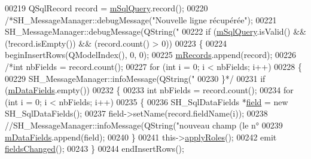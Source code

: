\begin{DoxyCode}
00219                 QSqlRecord record = \hyperlink{classSimpleHotel_1_1SH__SqlDataModel_a6dec49c799f534f4b19902e6eb1c99a7}{mSqlQuery}.record();
00220                 \textcolor{comment}{/*SH\_MessageManager::debugMessage("Nouvelle ligne récupérée");}
00221 \textcolor{comment}{                SH\_MessageManager::debugMessage(QString("%
00222                 \textcolor{keywordflow}{if} (\hyperlink{classSimpleHotel_1_1SH__SqlDataModel_a6dec49c799f534f4b19902e6eb1c99a7}{mSqlQuery}.isValid() && (!record.isEmpty()) && (record.count() > 0))
00223                 \{
00224                     beginInsertRows(QModelIndex(), 0, 0);
00225                     \hyperlink{classSimpleHotel_1_1SH__SqlDataModel_af73abbb951de936944285571f34407c5}{mRecords}.append(record);
00226                     \textcolor{comment}{/*int nbFields = record.count();}
00227 \textcolor{comment}{                    for (int i = 0; i < nbFields; i++)}
00228 \textcolor{comment}{                    \{}
00229 \textcolor{comment}{                        SH\_MessageManager::infoMessage(QString("%
00230 \textcolor{comment}{                    \}*/}
00231                     \textcolor{keywordflow}{if} (\hyperlink{classSimpleHotel_1_1SH__SqlDataModel_aa583366a8960adea9a0719a63fa03a24}{mDataFields}.empty())
00232                     \{
00233                         \textcolor{keywordtype}{int} nbFields = record.count();
00234                         \textcolor{keywordflow}{for} (\textcolor{keywordtype}{int} i = 0; i < nbFields; i++)
00235                         \{
00236                             SH\_SqlDataFields *\hyperlink{classSimpleHotel_1_1SH__SqlDataModel_a19ff52676ebed5ac65be5e0fe9d51171}{field} = \textcolor{keyword}{new} SH\_SqlDataFields();
00237                             field->setName(record.fieldName(i));
00238                             \textcolor{comment}{//SH\_MessageManager::infoMessage(QString("nouveau champ (le n°%
00239                             \hyperlink{classSimpleHotel_1_1SH__SqlDataModel_aa583366a8960adea9a0719a63fa03a24}{mDataFields}.append(field);
00240                         \}
00241                         this->\hyperlink{classSimpleHotel_1_1SH__SqlDataModel_a8de3952fd015f7ef4f8f079cb729306d}{applyRoles}();
00242                         emit \hyperlink{classSimpleHotel_1_1SH__SqlDataModel_add54351eeeb2b613df969698eaccb8b9}{fieldsChanged}();
00243                     \}
00244                     endInsertRows();
}}}
\end{DoxyCode}
